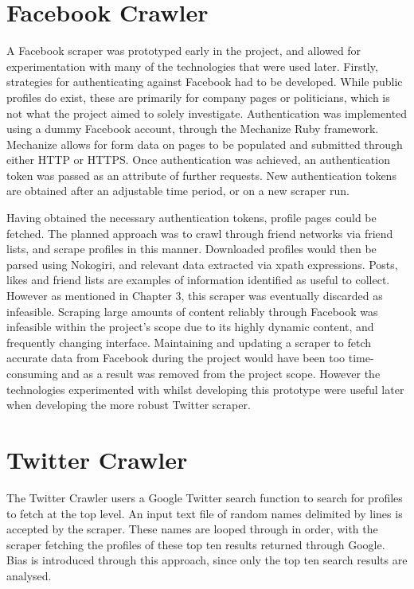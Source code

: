 \section{Facebook Crawler}

A Facebook scraper was prototyped early in the project, and allowed for experimentation with many of the technologies that were used later. Firstly, strategies for authenticating against Facebook had to be developed. While public profiles do exist, these are primarily for company pages or politicians, which is not what the project aimed to solely investigate. Authentication was implemented using a dummy Facebook account, through the Mechanize Ruby framework. Mechanize allows for form data on pages to be populated and submitted through either HTTP or HTTPS. Once authentication was achieved, an authentication token was passed as an attribute of further requests. New authentication tokens are obtained after an adjustable time period, or on a new scraper run. 

Having obtained the necessary authentication tokens, profile pages could be fetched. The planned approach was to crawl through friend networks via friend lists, and scrape profiles in this manner. Downloaded profiles would then be parsed using Nokogiri, and relevant data extracted via xpath expressions. Posts, likes and friend lists are examples of information identified as useful to collect. However as mentioned in Chapter 3, this scraper was eventually discarded as infeasible. Scraping large amounts of content reliably through Facebook was infeasible within the project's scope due to its highly dynamic content, and frequently changing interface. Maintaining and updating a scraper to fetch accurate data from Facebook during the project would have been too time-consuming and as a result was removed from the project scope. However the technologies experimented with whilst developing this prototype were useful later when developing the more robust Twitter scraper.


\section{Twitter Crawler}

The Twitter Crawler users a Google Twitter search function to search for profiles to fetch at the top level. An input text file of random names delimited by lines is accepted by the scraper. These names are looped through in order, with the scraper fetching the profiles of these top ten results returned through Google. Bias is introduced through this approach, since only the top ten search results are analysed. 

